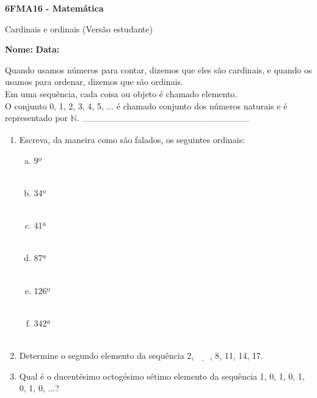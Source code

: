 \documentclass[a4paper,14pt]{article}
\begin{document}
	
	\noindent\textbf{6FMA16 - Matemática} 
	
	\begin{center}Cardinais e ordinais (Versão estudante)
	\end{center}
	
	\noindent\textbf{Nome:} \underline{\hspace{10cm}}
	\noindent\textbf{Data:} \underline{\hspace{4cm}}
	
	
	\begin{multicols}{2}
		\noindent Quando usamos números para contar, dizemos que eles são cardinais, e quando os usamos para ordenar, dizemos que são ordinais. \\
		Em uma sequência, cada coisa ou objeto é chamado elemento. \\
		O conjunto {0, 1, 2, 3, 4, 5, ...} é chamado conjunto dos números naturais e é representado por $\mathbb{N}$.
		\noindent\textsubscript{-----------------------------------------------------------------------}
		\begin{enumerate} 
			\item Escreva, da maneira como são falados, os seguintes ordinais:
			\begin{enumerate}[a)]
				\item 9º \\\\
				\item 34º \\\\
				\item 41ª \\\\
				\item 87ª \\\\
				\item 126º \\\\
				\item 342ª \\\\
			\end{enumerate}
			\item Determine o segundo elemento da sequência 2, $\underline{~~~~~~~}$, 8, 11, 14, 17.
			\item Qual é o ducentésimo octogésimo sétimo elemento da sequência 1, 0, 1, 0, 1, 0, 1, 0, ...? \\\\\\

\end{enumerate}
\end{multicols}
\end{document}
